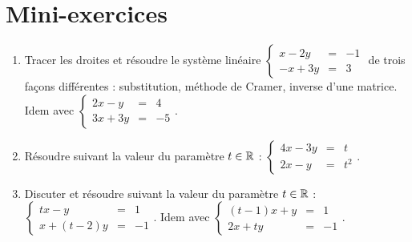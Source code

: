 \section{Mini-exercices}

\begin{frame}

\begin{miniexercice}
\begin{enumerate}
  \item Tracer les droites et résoudre le système linéaire   
$\left\{\begin{array}{rcl} 
x-2y  & = & -1\\
-x+3y & = & 3 
\end{array}\right.$ de trois façons différentes : 
substitution, méthode de Cramer, inverse d'une matrice.
Idem avec $\left\{\begin{array}{rcl} 
2x-y  & = & 4\\
3x+3y & = & -5 
\end{array}\right..$

  \item Résoudre suivant la valeur du paramètre $t\in \mathbb{R}$ : 
$\left\{\begin{array}{rcl} 
4x-3y & = & t\\
2x-y  & = & t^2 
\end{array}\right..$

  \item  Discuter et résoudre suivant la valeur du paramètre $t\in \mathbb{R}$ :  
$\left\{\begin{array}{rcl} 
tx-y     & = & 1\\
x+(t-2)y & = & -1 
\end{array}\right..$
Idem avec $\left\{\begin{array}{rcl} 
(t-1)x+y & = & 1\\
2x+ty    & = & -1 
\end{array}\right..$

\end{enumerate}

\end{miniexercice}

\end{frame}


